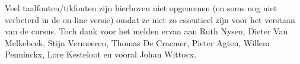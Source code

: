 \documentclass[11pt]{fund}
\begin{document}
Veel taalfouten/tikfouten zijn hierboven niet opgenomen (en soms nog
niet verbeterd in de on-line versie) omdat ze niet zo essentieel zijn
voor het verstaan van de cursus. Toch dank voor het melden ervan aan
Ruth Nysen, Dieter Van Melkebeek, Stijn Vermeeren, Thomas De Craemer,
Pieter Agten, Willem Penninckx, Lore Kesteloot en vooral Johan Wittocx.
\end{document}
